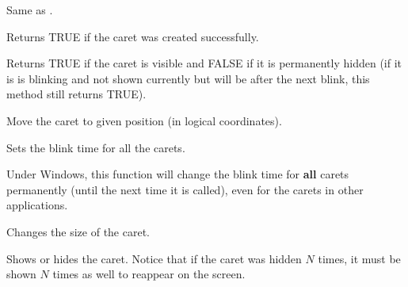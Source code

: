 
Same as .

\label{wxcaretisok}


Returns TRUE if the caret was created successfully.

\label{wxcaretisvisible}


Returns TRUE if the caret is visible and FALSE if it is permanently
hidden (if it is is blinking and not shown currently but will be after the
next blink, this method still returns TRUE).

\label{wxcaretmove}



Move the caret to given position (in logical coordinates).

\label{wxcaretsetblinktime}


Sets the blink time for all the carets.


Under Windows, this function will change the blink time for {\bf all} carets
permanently (until the next time it is called), even for the carets in other
applications.



\label{wxcaretsetsize}



Changes the size of the caret.

\label{wxcaretshow}


Shows or hides the caret. Notice that if the caret was hidden $N$ times, it
must be shown $N$ times as well to reappear on the screen.

